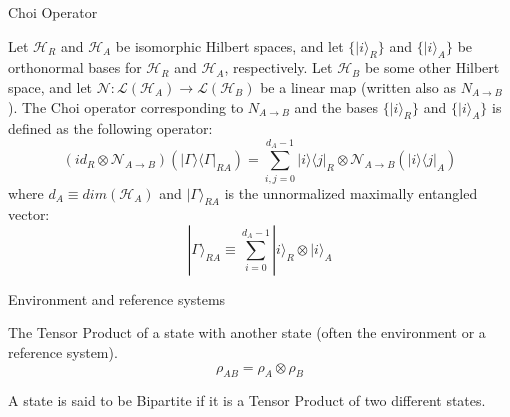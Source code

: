 \begin{frame}{Choi Operator}
    \begin{definition}
        Let $\mathcal{H}_R$ and $\mathcal{H}_A$ be isomorphic Hilbert spaces, and let
        $\{| i\rangle_R \}$ and $\{|i\rangle_A \}$ be orthonormal bases for $\mathcal{H}_R$
        and $\mathcal{H}_A$, respectively. Let $\mathcal{H}_B$ be some other Hilbert space,
        and let $\mathcal{N} : \mathcal{L}(\mathcal{H}_A) \rightarrow \mathcal{L}(\mathcal{H}_B)$
        be a linear map (written also as $N_{A\rightarrow B}$). The Choi operator corresponding
        to $N_{A\rightarrow B}$ and the bases $\{| i\rangle_R \}$ and $\{|i\rangle_A \}$ is defined
        as the following operator:
        \begin{equation*}
            (id_R \otimes \mathcal{N}_{A \rightarrow B})(| \Gamma \rangle\langle \Gamma |_{RA})
            = \displaystyle\sum_{i,j = 0}^{d_A-1}| i \rangle\langle j |_R \otimes \mathcal{N}_{A \rightarrow B}(| i \rangle\langle j |_A)
        \end{equation*}
        where $d_A \equiv dim(\mathcal{H}_A)$ and $| \Gamma \rangle_{RA}$ is the unnormalized maximally entangled vector:
        \begin{equation*}
            | \Gamma \rangle_{RA} \equiv \displaystyle\sum_{i=0}^{d_A - 1} | i \rangle_R \otimes | i \rangle_A
        \end{equation*}
    \end{definition}
\end{frame}

\begin{frame}{Environment and reference systems}
    \begin{definition}
        The Tensor Product of a state with another state (often the environment or a reference system).
        \begin{equation*}
            \rho_{AB} = \rho_A \otimes \rho_B
        \end{equation*}
    \end{definition}
    \begin{definition}
        A state is said to be Bipartite if it is a Tensor Product of two different states.
    \end{definition}
\end{frame}

